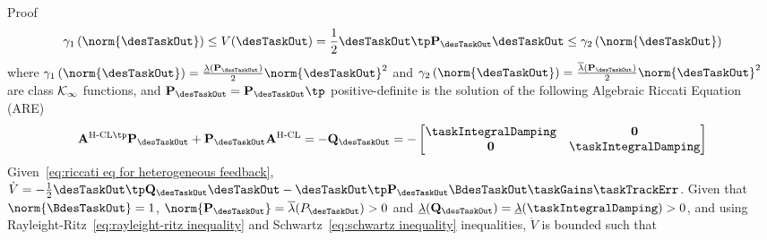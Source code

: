 \begin{custumProof}{Proof}
	\begin{align}\label{eq:Lyapunov function xi heterogeneous feedback}
		\gamma_1\left(\norm{\desTaskOut}\right)\leq V(\desTaskOut) = \frac{1}{2}\desTaskOut\tp\mathbf{P}_\desTaskOut\desTaskOut\leq\gamma_2\left(\norm{\desTaskOut}\right)%
	\end{align}
	where $\gamma_1\left(\norm{\desTaskOut}\right)=\frac{\underline{\lambda}(\mathbf{P}_\desTaskOut)}{2}\norm{\desTaskOut}^2$ and $\gamma_2\left(\norm{\desTaskOut}\right)=\frac{\overline{\lambda}(\mathbf{P}_\desTaskOut)}{2}\norm{\desTaskOut}^2$ are class $\cal K_\infty$ functions, and $\mathbf{P}_\desTaskOut=\mathbf{P}_\desTaskOut\tp$ positive-definite is the solution of the following Algebraic Riccati Equation (ARE)
	\begin{equation}\label{eq:riccati eq for heterogeneous feedback}
		\mathbf{A}^{\text{H-CL}\tp}\mathbf{P}_\desTaskOut + \mathbf{P}_\desTaskOut \mathbf{A}^{\text{H-CL}} = -\mathbf{Q}_\desTaskOut = -\begin{bmatrix}
			\taskIntegralDamping & \mathbf{0} \\ \mathbf{0} & \taskIntegralDamping
		\end{bmatrix}
	\end{equation}
	Given~\cref{eq:riccati eq for heterogeneous feedback}, $\dot{V} = -\frac{1}{2}\desTaskOut\tp\mathbf{Q}_\desTaskOut \desTaskOut - \desTaskOut\tp\mathbf{P}_\desTaskOut \BdesTaskOut \taskGains\taskTrackErr$.  
	Given that $\norm{\BdesTaskOut}=1$,  $\norm{\mathbf{P}_\desTaskOut}=\overline{\lambda}(P_\desTaskOut)>0$ and $\underline{\lambda}(\mathbf{Q}_\desTaskOut) =\underline{\lambda}(\taskIntegralDamping)>0$, and using Rayleight-Ritz~\cref{eq:rayleight-ritz inequality} and Schwartz~\cref{eq:schwartz inequality} inequalities, $\dot{V}$ is bounded such that

\end{custumProof}
